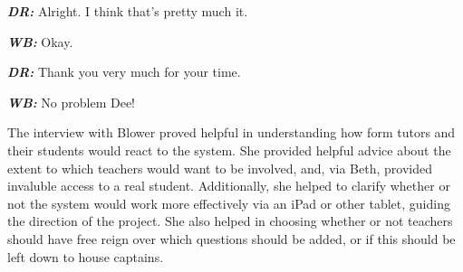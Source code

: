 \textit{\textbf{DR:}} Alright. I think that's pretty much it.

\textit{\textbf{WB:}} Okay.

\textit{\textbf{DR:}} Thank you very much for your time.

\textit{\textbf{WB:}} No problem Dee!

The interview with Blower proved helpful in understanding how form tutors and their students would react to the system. She provided helpful advice about the extent to which teachers would want to be involved, and, via Beth, provided invaluble access to a real student. Additionally, she helped to clarify whether or not the system would work more effectively via an iPad or other tablet, guiding the direction of the project. She also helped in choosing whether or not teachers should have free reign over which questions should be added, or if this should be left down to house captains.
